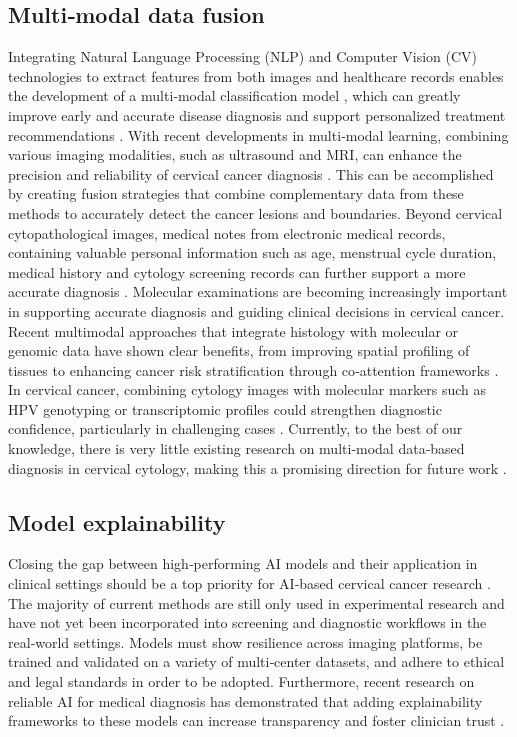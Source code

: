 \documentclass{svjour3}
\begin{document}
\subsection{Multi‑modal data fusion}
Integrating Natural Language Processing (NLP) and Computer Vision (CV) technologies to extract features from both images and healthcare records enables the development of a multi‑modal classification model \cite{ref162}, which can greatly improve early and accurate disease diagnosis and support personalized treatment recommendations \cite{ref124,ref125}. With recent developments in multi‑modal learning, combining various imaging modalities, such as ultrasound and MRI, can enhance the precision and reliability of cervical cancer diagnosis \cite{ref119}. This can be accomplished by creating fusion strategies that combine complementary data from these methods to accurately detect the cancer lesions and boundaries. Beyond cervical cytopathological images, medical notes from electronic medical records, containing valuable personal information such as age, menstrual cycle duration, medical history and cytology screening records can further support a more accurate diagnosis \cite{ref163}. Molecular examinations are becoming increasingly important in supporting accurate diagnosis and guiding clinical decisions in cervical cancer. Recent multimodal approaches that integrate histology with molecular or genomic data have shown clear benefits, from improving spatial profiling of tissues \cite{ref164} to enhancing cancer risk stratification through co‑attention frameworks \cite{ref165}. In cervical cancer, combining cytology images with molecular markers such as HPV genotyping or transcriptomic profiles could strengthen diagnostic confidence, particularly in challenging cases \cite{ref162}. Currently, to the best of our knowledge, there is very little existing research on multi‑modal data‑based diagnosis in cervical cytology, making this a promising direction for future work \cite{ref122,ref150,ref166}.
\subsection{Model explainability}
Closing the gap between high‑performing AI models and their application in clinical settings should be a top priority for AI‑based cervical cancer research \cite{ref167}. The majority of current methods are still only used in experimental research and have not yet been incorporated into screening and diagnostic workflows in the real‑world settings. Models must show resilience across imaging platforms, be trained and validated on a variety of multi‑center datasets, and adhere to ethical and legal standards in order to be adopted. Furthermore, recent research on reliable AI for medical diagnosis has demonstrated that adding explainability frameworks to these models can increase transparency and foster clinician trust \cite{ref168}.
\end{document}
